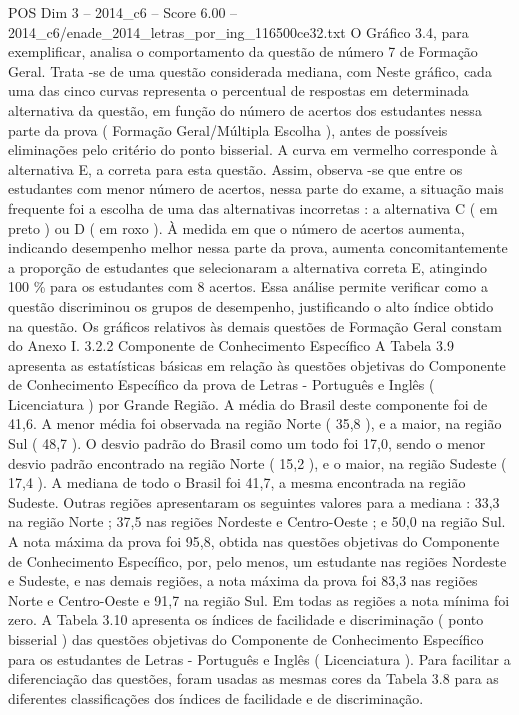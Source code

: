 \begin{textsample}{POS Dim 3 – 2014\_c6 – Score 6.00 – 2014\_c6/enade\_2014\_letras\_por\_ing\_116500ce32.txt}
O Gráfico 3.4, para exemplificar, analisa o comportamento da questão de número 7 de Formação Geral.
Trata -se de uma questão considerada mediana, com Neste gráfico, cada uma das cinco curvas representa o percentual de respostas em determinada alternativa da questão, em função do número de acertos dos estudantes nessa parte da prova ( Formação Geral/Múltipla Escolha ), antes de possíveis eliminações pelo critério do ponto bisserial.
A curva em vermelho corresponde à alternativa E, a correta para esta questão.
Assim, observa -se que entre os estudantes com menor número de acertos, nessa parte do exame, a situação mais frequente foi a escolha de uma das alternativas incorretas : a alternativa C ( em preto ) ou D ( em roxo ).
À medida em que o número de acertos aumenta, indicando desempenho melhor nessa parte da prova, aumenta concomitantemente a proporção de estudantes que selecionaram a alternativa correta E, atingindo 100 \% para os estudantes com 8 acertos.
Essa análise permite verificar como a questão discriminou os grupos de desempenho, justificando o alto índice obtido na questão.
Os gráficos relativos às demais questões de Formação Geral constam do Anexo I. 3.2.2 Componente de Conhecimento Específico A Tabela 3.9 apresenta as estatísticas básicas em relação às questões objetivas do Componente de Conhecimento Específico da prova de Letras - Português e Inglês ( Licenciatura ) por Grande Região.
A média do Brasil deste componente foi de 41,6.
A menor média foi observada na região Norte ( 35,8 ), e a maior, na região Sul ( 48,7 ).
O desvio padrão do Brasil como um todo foi 17,0, sendo o menor desvio padrão encontrado na região Norte ( 15,2 ), e o maior, na região Sudeste ( 17,4 ).
A mediana de todo o Brasil foi 41,7, a mesma encontrada na região Sudeste.
Outras regiões apresentaram os seguintes valores para a mediana : 33,3 na região Norte ; 37,5 nas regiões Nordeste e Centro-Oeste ; e 50,0 na região Sul.
A nota máxima da prova foi 95,8, obtida nas questões objetivas do Componente de Conhecimento Específico, por, pelo menos, um estudante nas regiões Nordeste e Sudeste, e nas demais regiões, a nota máxima da prova foi 83,3 nas regiões Norte e Centro-Oeste e 91,7 na região Sul.
Em todas as regiões a nota mínima foi zero.
A Tabela 3.10 apresenta os índices de facilidade e discriminação ( ponto bisserial ) das questões objetivas do Componente de Conhecimento Específico para os estudantes de Letras - Português e Inglês ( Licenciatura ).
Para facilitar a diferenciação das questões, foram usadas as mesmas cores da Tabela 3.8 para as diferentes classificações dos índices de facilidade e de discriminação.

\end{textsample}
